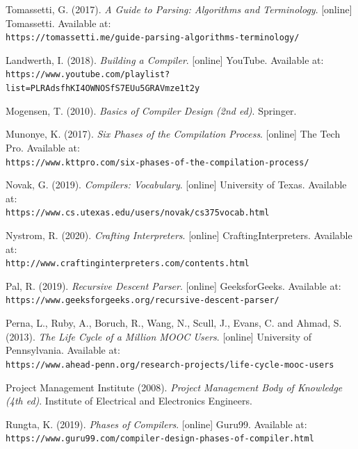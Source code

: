\documentclass[
]{report}
\begin{document}
\begin{thebibliography}{24}
	Tomassetti, G. (2017).
	\textit{A Guide to Parsing: Algorithms and Terminology}.
	[online] Tomassetti. Available at:
	\\\texttt{https://tomassetti.me/guide-parsing-algorithms-terminology/}
	
	Landwerth, I. (2018).
	\textit{Building a Compiler}.
	[online] YouTube. Available at:
	\\\texttt{https://www.youtube.com/playlist?list=PLRAdsfhKI4OWNOSfS7EUu5GRAVmze1t2y}
	
	Mogensen, T. (2010).
	\textit{Basics of Compiler Design (2nd ed)}.
	Springer.
	
	Munonye, K. (2017).
	\textit{Six Phases of the Compilation Process}.
	[online] The Tech Pro. Available at:
	\\\texttt{https://www.kttpro.com/six-phases-of-the-compilation-process/}
	
	Novak, G. (2019).
	\textit{Compilers: Vocabulary}.
	[online] University of Texas. Available at:
	\\\texttt{https://www.cs.utexas.edu/users/novak/cs375vocab.html}
	
	Nystrom, R. (2020).
	\textit{Crafting Interpreters}.
	[online] CraftingInterpreters. Available at:
	\\\texttt{http://www.craftinginterpreters.com/contents.html}
	
	Pal, R. (2019).
	\textit{Recursive Descent Parser}.
	[online] GeeksforGeeks. Available at:
	\\\texttt{https://www.geeksforgeeks.org/recursive-descent-parser/}
	
	Perna, L., Ruby, A., Boruch, R., Wang, N., Scull, J., Evans, C. and Ahmad, S. (2013).
	\textit{The Life Cycle of a Million MOOC Users}.
	[online] University of Pennsylvania. Available at:
	\\\texttt{https://www.ahead-penn.org/research-projects/life-cycle-mooc-users}
	
	Project Management Institute (2008).
	\textit{Project Management Body of Knowledge (4th ed)}.
	Institute of Electrical and Electronics Engineers.
	
	Rungta, K. (2019).
	\textit{Phases of Compilers}.
	[online] Guru99. Available at:
	\\\texttt{https://www.guru99.com/compiler-design-phases-of-compiler.html}
	

\end{thebibliography}
\end{document}
